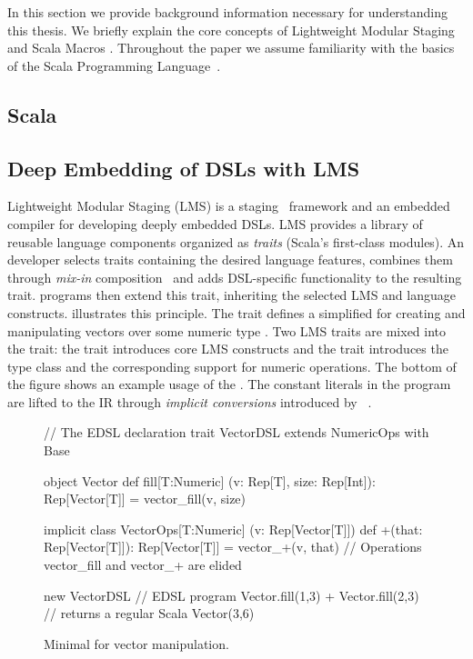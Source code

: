 In this section we provide background information necessary for understanding this
thesis. We briefly explain the core concepts of Lightweight Modular Staging
\cite{rompf_lightweight_2012,rompf_optimizing_2013} and Scala Macros
\cite{burmako_scala_2013}. Throughout the paper we assume familiarity with
the basics of the Scala Programming Language~\cite{odersky_scala_2004}.
\subsection{Scala}
\subsection{Deep Embedding of DSLs with LMS}
\label{subsec:deep-embedding}

Lightweight Modular Staging (LMS) is a
staging~\cite{taha_multi-stage_1997} framework and an embedded
compiler for developing deeply embedded DSLs.  LMS provides a library
of reusable language components organized as \emph{traits} (Scala's
first-class modules).  An \edsl developer selects traits containing
the desired language features, combines them through \emph{mix-in}
composition~\cite{odersky_scalable_2005} and adds DSL-specific
functionality to the resulting \edsl trait.  \edsl programs then
extend this trait, inheriting the selected LMS and \edsl language
constructs.  illustrates this principle.  The trait
 defines a simplified \edsl for creating and
manipulating vectors over some numeric type .  Two LMS traits
are mixed into the  trait: the  trait
introduces core LMS constructs %
and the  trait introduces the  type
class and the corresponding support for numeric operations.  The
bottom of the figure shows an example usage of the \edsl. The constant
literals in the program are lifted to the IR through \emph{implicit
  conversions} introduced by
~\cite{oliveira_type_2010}.

\begin{figure}
\begin{listingtiny}
// The EDSL declaration
trait VectorDSL extends NumericOps with Base {
  object Vector {
    def fill[T:Numeric]
      (v: Rep[T], size: Rep[Int]): Rep[Vector[T]] =
      vector_fill(v, size)
  }

  implicit class VectorOps[T:Numeric]
    (v: Rep[Vector[T]]) {
    def +(that: Rep[Vector[T]]): Rep[Vector[T]] =
      vector_+(v, that)
  }
  // Operations vector_fill and vector_+ are elided
}

new VectorDSL { // EDSL program
  Vector.fill(1,3) + Vector.fill(2,3)
} // returns a regular Scala Vector(3,6)
\end{listingtiny}
\caption{\label{lst:lms} Minimal \edsl for vector manipulation.}
\end{figure}

